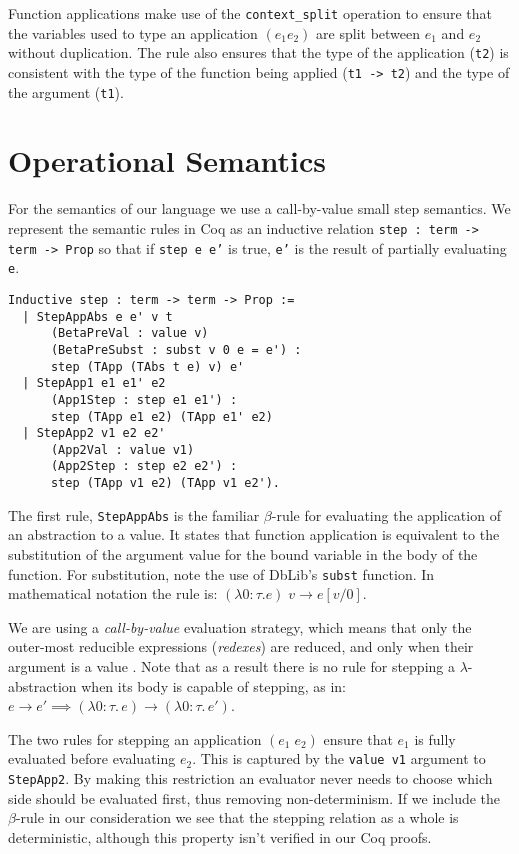 \documentclass[]{unswthesis}
\let\c\texttt
\let\i\textit
\begin{document}
Function applications make use of the \c{context_split} operation to ensure that the variables used to type an application $(e_1 e_2)$ are split between $e_1$ and $e_2$ without duplication. The rule also ensures that the type of the application (\c{t2}) is consistent with the type of the function being applied (\c{t1 -> t2}) and the type of the argument (\c{t1}).

\section{Operational Semantics}

For the semantics of our language we use a call-by-value small step semantics. We represent the semantic rules in Coq as an inductive relation \c{step : term -> term -> Prop} so that if \c{step e e'} is true, \c{e'} is the result of partially evaluating \c{e}.

\begin{verbatim}
Inductive step : term -> term -> Prop :=
  | StepAppAbs e e' v t
      (BetaPreVal : value v)
      (BetaPreSubst : subst v 0 e = e') :
      step (TApp (TAbs t e) v) e'
  | StepApp1 e1 e1' e2
      (App1Step : step e1 e1') :
      step (TApp e1 e2) (TApp e1' e2)
  | StepApp2 v1 e2 e2'
      (App2Val : value v1)
      (App2Step : step e2 e2') :
      step (TApp v1 e2) (TApp v1 e2').
\end{verbatim}

The first rule, \c{StepAppAbs} is the familiar $\beta$-rule for evaluating the application of an abstraction to a value. It states that function application is equivalent to the substitution of the argument value for the bound variable in the body of the function. For substitution, note the use of DbLib's \c{subst} function. In mathematical notation the rule is: $(\lambda 0 : \tau. e) \; v \rightarrow e[v/0]$.

We are using a \i{call-by-value} evaluation strategy, which means that only the outer-most reducible expressions (\i{redexes}) are reduced, and only when their argument is a value \cite{tapl}. Note that as a result there is no rule for stepping a $\lambda$-abstraction when its body is capable of stepping, as in: $e \rightarrow e' \implies (\lambda 0 : \tau. \, e) \rightarrow (\lambda 0 : \tau. \, e')$.

The two rules for stepping an application $(e_1 \; e_2)$ ensure that $e_1$ is fully evaluated before evaluating $e_2$. This is captured by the \c{value v1} argument to \c{StepApp2}. By making this restriction an evaluator never needs to choose which side should be evaluated first, thus removing non-determinism. If we include the $\beta$-rule in our consideration we see that the stepping relation as a whole is deterministic, although this property isn't verified in our Coq proofs.
\end{document}
